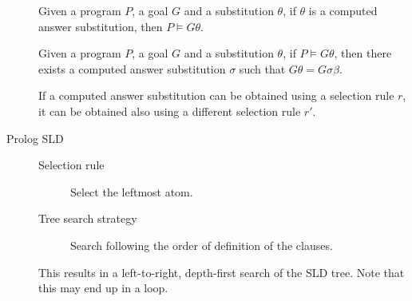 \begin{description}
        \begin{theorem}[Soundness]
            Given a program $P$, a goal $G$ and a substitution $\theta$,
            if $\theta$ is a computed answer substitution, then $P \models G\theta$.
        \end{theorem}

        \begin{theorem}[Completeness]
            Given a program $P$, a goal $G$ and a substitution $\theta$,
            if $P \models G\theta$, then there exists a computed answer substitution $\sigma$ such that $G\theta = G\sigma\beta$.
        \end{theorem}

        \begin{theorem}
            If a computed answer substitution can be obtained using a selection rule $r$, 
            it can be obtained also using a different selection rule $r'$.
        \end{theorem}

    \item[Prolog SLD] 
        \begin{description}
            \item[Selection rule] Select the leftmost atom.
            \item[Tree search strategy] Search following the order of definition of the clauses.
        \end{description}

        This results in a left-to-right, depth-first search of the SLD tree.
        Note that this may end up in a loop.
\end{description}